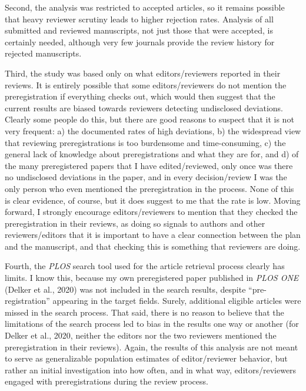 \documentclass[authordate, empirical]{jote-new-article}
\begin{document}
	Second, the analysis was restricted to accepted articles, so it remains possible that heavy reviewer scrutiny leads to higher rejection rates. Analysis of all submitted and reviewed manuscripts, not just those that were accepted, is certainly needed, although very few journals provide the review history for rejected manuscripts.



	Third, the study was based only on what editors/reviewers reported in their reviews. It is entirely possible that some editors/reviewers do not mention the preregistration if everything checks out, which would then suggest that the current results are biased towards reviewers detecting undisclosed deviations. Clearly some people do this, but there are good reasons to suspect that it is not very frequent: a) the documented rates of high deviations, b) the widespread view that reviewing preregistrations is too burdensome and time-consuming, c) the general lack of knowledge about preregistrations and what they are for, and d) of the many preregistered papers that I have edited/reviewed, only once was there no undisclosed deviations in the paper, and in every decision/review I was the only person who even mentioned the preregistration in the process. None of this is clear evidence, of course, but it does suggest to me that the rate is low. Moving forward, I strongly encourage editors/reviewers to mention that they checked the preregistration in their reviews, as doing so signals to authors and other reviewers/editors that it is important to have a clear connection between the plan and the manuscript, and that checking this is something that reviewers are doing.



	Fourth, the \emph{PLOS} search tool used for the article retrieval process clearly has limits. I know this, because my own preregistered paper published in \emph{PLOS ONE} (Delker et al., 2020) was not included in the search results, despite “pre-registration” appearing in the target fields. Surely, additional eligible articles were missed in the search process. That said, there is no reason to believe that the limitations of the search process led to bias in the results one way or another (for Delker et al., 2020, neither the editors nor the two reviewers mentioned the preregistration in their reviews). Again, the results of this analysis are not meant to serve as generalizable population estimates of editor/reviewer behavior, but rather an initial investigation into how often, and in what way, editors/reviewers engaged with preregistrations during the review process.
\end{document}

